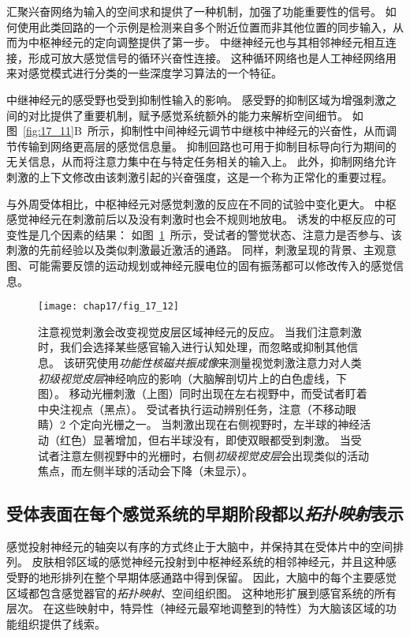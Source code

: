 汇聚兴奋网络为输入的空间求和提供了一种机制，加强了功能重要性的信号。
如何使用此类回路的一个示例是检测来自多个附近位置而非其他位置的同步输入，从而为中枢神经元的定向调整提供了第一步。 
中继神经元也与其相邻神经元相互连接，形成可放大感觉信号的循环兴奋性连接。 
这种循环网络也是人工神经网络用来对感觉模式进行分类的一些深度学习算法的一个特征。


中继神经元的感受野也受到抑制性输入的影响。 
感受野的抑制区域为增强刺激之间的对比提供了重要机制，赋予感觉系统额外的能力来解析空间细节。 
如图~\ref{fig:17_11}B~所示，抑制性中间神经元调节中继核中神经元的兴奋性，从而调节传输到网络更高层的感觉信息量。
抑制回路也可用于抑制目标导向行为期间的无关信息，从而将注意力集中在与特定任务相关的输入上。 
此外，抑制网络允许刺激的上下文修改由该刺激引起的兴奋强度，这是一个称为正常化的重要过程。


与外周受体相比，中枢神经元对感觉刺激的反应在不同的试验中变化更大。 
中枢感觉神经元在刺激前后以及没有刺激时也会不规则地放电。 
诱发的中枢反应的可变性是几个因素的结果：
如图~\ref{fig:17_12}~所示，受试者的警觉状态、注意力是否参与、该刺激的先前经验以及类似刺激最近激活的通路。
同样，刺激呈现的背景、主观意图、可能需要反馈的运动规划或神经元膜电位的固有振荡都可以修改传入的感觉信息。


\begin{figure}[htbp]
	\centering
	\texttt{[image: chap17/fig\_17\_12]}
	\caption{注意视觉刺激会改变视觉皮层区域神经元的反应。 
		当我们注意刺激时，我们会选择某些感官输入进行认知处理，而忽略或抑制其他信息。
		该研究使用\textit{功能性核磁共振成像}来测量视觉刺激注意力对人类\textit{初级视觉皮层}神经响应的影响（大脑解剖切片上的白色虚线，下图）。 
		移动光栅刺激（上图）同时出现在左右视野中，而受试者盯着中央注视点（黑点）。
		受试者执行运动辨别任务，注意（不移动眼睛）2 个定向光栅之一。
		当刺激出现在右侧视野时，左半球的神经活动（红色）显著增加，但右半球没有，即使双眼都受到刺激。 
		当受试者注意左侧视野中的光栅时，右侧\textit{初级视觉皮层}会出现类似的活动焦点，而左侧半球的活动会下降（未显示）\cite{gandhi1999spatial}。}
	\label{fig:17_12}
\end{figure}


\subsection{受体表面在每个感觉系统的早期阶段都以\textit{拓扑映射}表示}

感觉投射神经元的轴突以有序的方式终止于大脑中，并保持其在受体片中的空间排列。 
皮肤相邻区域的感觉神经元投射到中枢神经系统的相邻神经元，并且这种感受野的地形排列在整个早期体感通路中得到保留。 
因此，大脑中的每个主要感觉区域都包含感觉器官的\textit{拓扑映射}、空间组织图。
这种地形扩展到感官系统的所有层次。 
在这些映射中，特异性（神经元最窄地调整到的特性）为大脑该区域的功能组织提供了线索。



